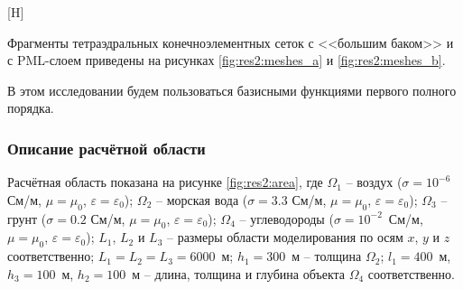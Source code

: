 \documentclass[a4paper,14pt]{article}
\makeatletter
\renewenvironment{figure}[1][\fps@figure]{
  \edef\@tempa{\noexpand\@float{figure}[#1]}
  \@tempa
  \addtocounter{foofigure}{1}
}{
  \end@float
}
\makeatother
\begin{document}
\begin{figure}[H]
	\centering
	\caption{конечноэлементные сетки: (а) <<большой бак>> и (б) PML-слой}
	\label{fig:res2:meshes}
\end{figure}

Фрагменты тетраэдральных конечноэлементных сеток с <<большим баком>> и с PML-слоем приведены на рисунках \ref{fig:res2:meshes_a} и \ref{fig:res2:meshes_b}.

В этом исследовании будем пользоваться базисными функциями первого полного порядка.

\subsubsection{Описание расчётной области}
Расчётная область показана на рисунке \ref{fig:res2:area}, где $\Omega_1$ -- воздух ($\sigma=10^{-6}$ См/м, $\mu=\mu_0$, $\varepsilon=\varepsilon_0$); $\Omega_2$ -- морская вода ($\sigma=3.3$ См/м, $\mu=\mu_0$, $\varepsilon=\varepsilon_0$); $\Omega_3$ -- грунт ($\sigma=0.2$ См/м, $\mu=\mu_0$, $\varepsilon=\varepsilon_0$); $\Omega_4$ -- углеводороды ($\sigma=10^{-2}$~См/м, $\mu=\mu_0$, $\varepsilon=\varepsilon_0$); $L_1$, $L_2$ и $L_3$ -- размеры области моделирования по осям $x$, $y$ и $z$ соответственно; $L_1 = L_2 = L_3 = 6000$~м; $h_1=300$~м -- толщина $\Omega_2$; $l_1=400$~м, $h_3=100$~м, $h_2=100$~м -- длина, толщина и глубина объекта $\Omega_4$ соответственно.
\end{document}
